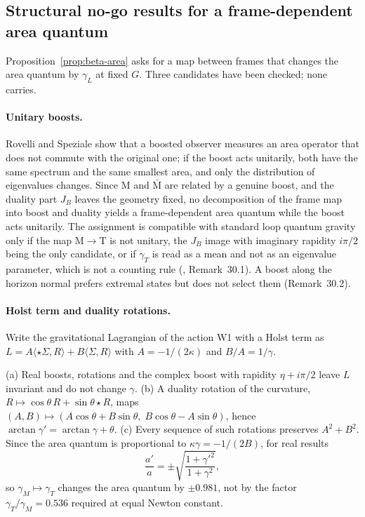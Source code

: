 \subsection{Structural no-go results for a frame-dependent area quantum}
\label{sec:beta-nogo}

Proposition~\ref{prop:beta-area} asks for a map between frames that changes the area quantum by $\gamma_L$ at fixed $G$.  Three candidates have
been checked; none carries.

\paragraph{Unitary boosts.}
Rovelli and Speziale \cite{RovelliSpeziale2003} show that a boosted observer measures an area operator that does not commute with the original one;
if the boost acts unitarily, both have the same spectrum and the same smallest area, and only the distribution of eigenvalues changes.  Since M
and $\bar{\mathrm M}$ are related by a genuine boost, and the duality part $J_B$ leaves the geometry fixed, no decomposition of the frame map into
boost and duality yields a frame-dependent area quantum while the boost acts unitarily.  The assignment is compatible with standard loop quantum
gravity only if the map $\mathrm M\to\mathrm T$ is not unitary, the $J_B$ image with imaginary rapidity $i\pi/2$ being the only candidate, or if
$\gamma_T$ is read as a mean and not as an eigenvalue parameter, which is not a counting rule (, Remark~30.1).  A boost along the horizon normal prefers extremal states but does not select them (Remark~30.2).

\paragraph{Holst term and duality rotations.}
Write the gravitational Lagrangian of the action W1 with a Holst term \cite{Holst1996} as $L=A\langle\star\Sigma,R\rangle+B\langle\Sigma,R\rangle$
with $A=-1/(2\kappa)$ and $B/A=1/\gamma$.

\begin{proposition}
\label{prop:beta-holst}
\textup{(a)} Real boosts, rotations and the complex boost with rapidity $\eta+i\pi/2$ leave $L$ invariant and do not change $\gamma$.
\textup{(b)} A duality rotation of the curvature, $R\mapsto\cos\theta\,R+\sin\theta\star R$, maps $(A,B)\mapsto(A\cos\theta+B\sin\theta,\;B\cos\theta-A\sin\theta)$,
hence $\arctan\gamma'=\arctan\gamma+\theta$.  \textup{(c)} Every sequence of such rotations preserves $A^2+B^2$.  Since the area quantum is
proportional to $\kappa\gamma=-1/(2B)$, for real results
\begin{equation}
 \frac{a'}{a}=\pm\sqrt{\frac{1+\gamma'^2}{1+\gamma^2}} ,
 \label{eq:beta-holst}
\end{equation}
so $\gamma_M\mapsto\gamma_T$ changes the area quantum by $\pm0.981$, not by the factor $\gamma_T/\gamma_M=0.536$ required at equal Newton constant.
\end{proposition}


